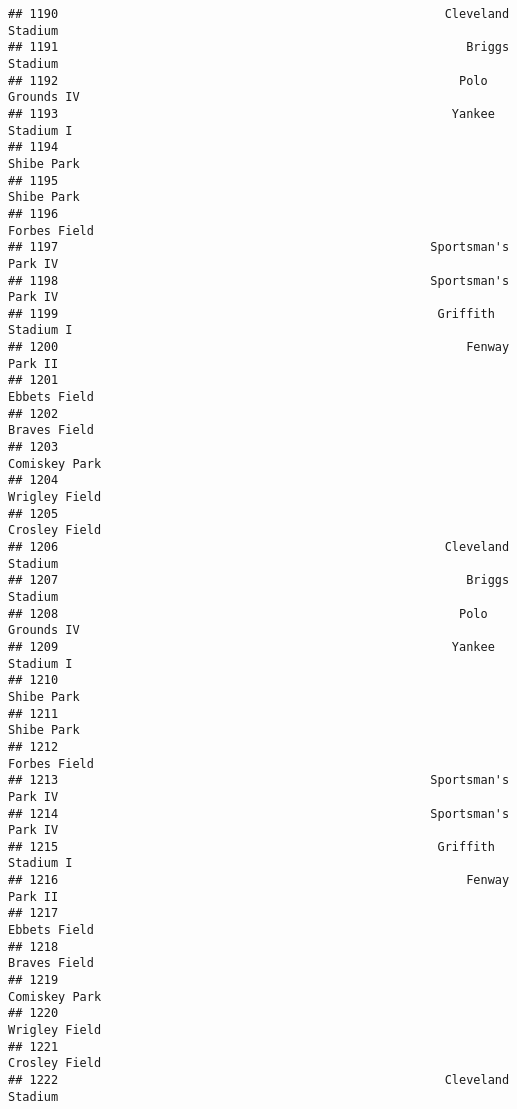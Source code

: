 \documentclass[]{article}
\begin{document}
\begin{verbatim}
## 1190                                                      Cleveland Stadium
## 1191                                                         Briggs Stadium
## 1192                                                        Polo Grounds IV
## 1193                                                       Yankee Stadium I
## 1194                                                             Shibe Park
## 1195                                                             Shibe Park
## 1196                                                           Forbes Field
## 1197                                                    Sportsman's Park IV
## 1198                                                    Sportsman's Park IV
## 1199                                                     Griffith Stadium I
## 1200                                                         Fenway Park II
## 1201                                                           Ebbets Field
## 1202                                                           Braves Field
## 1203                                                          Comiskey Park
## 1204                                                          Wrigley Field
## 1205                                                          Crosley Field
## 1206                                                      Cleveland Stadium
## 1207                                                         Briggs Stadium
## 1208                                                        Polo Grounds IV
## 1209                                                       Yankee Stadium I
## 1210                                                             Shibe Park
## 1211                                                             Shibe Park
## 1212                                                           Forbes Field
## 1213                                                    Sportsman's Park IV
## 1214                                                    Sportsman's Park IV
## 1215                                                     Griffith Stadium I
## 1216                                                         Fenway Park II
## 1217                                                           Ebbets Field
## 1218                                                           Braves Field
## 1219                                                          Comiskey Park
## 1220                                                          Wrigley Field
## 1221                                                          Crosley Field
## 1222                                                      Cleveland Stadium

\end{verbatim}
\end{document}
